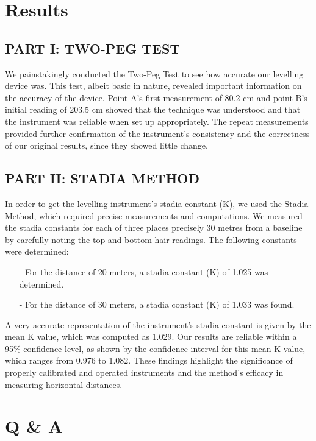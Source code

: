 \documentclass[12pt]{report}
\begin{document}
\section*{Results}


\subsection*{PART I: TWO-PEG TEST}

We painstakingly conducted the Two-Peg Test to see how accurate our levelling device was. This test, albeit basic in nature, revealed important information on the accuracy of the device. Point A's first measurement of 80.2 cm and point B's initial reading of 203.5 cm showed that the technique was understood and that the instrument was reliable when set up appropriately. The repeat measurements provided further confirmation of the instrument's consistency and the correctness of our original results, since they showed little change.


\subsection*{PART II: STADIA METHOD}

In order to get the levelling instrument's stadia constant (K), we used the Stadia Method, which required precise measurements and computations. We measured the stadia constants for each of three places precisely 30 metres from a baseline by carefully noting the top and bottom hair readings. The following constants were determined:

\begin{itemize}
\item[-]  For the distance of 20 meters, a stadia constant (K) of 1.025 was determined.
\item[-] For the distance of 30 meters, a stadia constant (K) of 1.033 was found.
\end{itemize}

A very accurate representation of the instrument's stadia constant is given by the mean K value, which was computed as 1.029. Our results are reliable within a 95\% confidence level, as shown by the confidence interval for this mean K value, which ranges from 0.976 to 1.082. These findings highlight the significance of properly calibrated and operated instruments and the method's efficacy in measuring horizontal distances.

\newpage
\section*{Q \& A}
\end{document}

